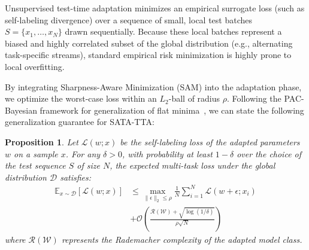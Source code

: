 \documentclass{article}
\theoremstyle{plain}
\newtheorem{proposition}[theorem]{Proposition}
\theoremstyle{definition}
\theoremstyle{remark}
\begin{document}
Unsupervised test-time adaptation minimizes an empirical surrogate loss (such as self-labeling divergence) over a sequence of small, local test batches $S = \{x_1, \dots, x_N\}$ drawn sequentially. Because these local batches represent a biased and highly correlated subset of the global distribution (e.g., alternating task-specific streams), standard empirical risk minimization is highly prone to local overfitting.

By integrating Sharpness-Aware Minimization (SAM) into the adaptation phase, we optimize the worst-case loss within an $L_2$-ball of radius $\rho$. Following the PAC-Bayesian framework for generalization of flat minima~\cite{foret2020sharpness}, we can state the following generalization guarantee for SATA-TTA:

\begin{proposition}
\label{prop:generalization}
Let $\mathcal{L}(w; x)$ be the self-labeling loss of the adapted parameters $w$ on a sample $x$. For any $\delta > 0$, with probability at least $1 - \delta$ over the choice of the test sequence $S$ of size $N$, the expected multi-task loss under the global distribution $\mathcal{D}$ satisfies:
\begin{equation}
\begin{split}
\mathbb{E}_{x \sim \mathcal{D}} [\mathcal{L}(w; x)] &\le \max_{\|\epsilon\|_2 \le \rho} \frac{1}{N} \sum_{i=1}^N \mathcal{L}(w + \epsilon; x_i) \\
&+ \mathcal{O}\left( \frac{\mathcal{R}(\mathcal{W}) + \sqrt{\log(1/\delta)}}{\rho \sqrt{N}} \right)
\end{split}
\end{equation}
where $\mathcal{R}(\mathcal{W})$ represents the Rademacher complexity of the adapted model class.
\end{proposition}
\end{document}
